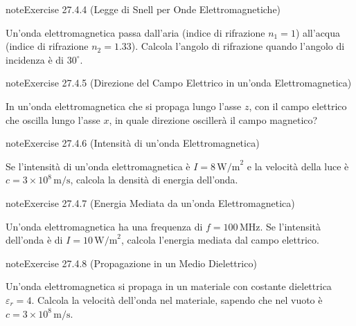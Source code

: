 \documentclass[letterpaper,10pt,italian]{jupyterBook}
\begin{document}
\begin{sphinxadmonition}{note}{Exercise 27.4.4 (Legge di Snell per Onde Elettromagnetiche)}



\sphinxAtStartPar
Un’onda elettromagnetica passa dall’aria (indice di rifrazione \(n_1 = 1\)) all’acqua (indice di rifrazione \(n_2 = 1.33\)). Calcola l’angolo di rifrazione quando l’angolo di incidenza è di \(30^\circ\).
\end{sphinxadmonition}
 \label{exercise:ch/electromagnetism/em-waves-problems-exercise-4}

\begin{sphinxadmonition}{note}{Exercise 27.4.5 (Direzione del Campo Elettrico in un’onda Elettromagnetica)}



\sphinxAtStartPar
In un’onda elettromagnetica che si propaga lungo l’asse \(z\), con il campo elettrico che oscilla lungo l’asse \(x\), in quale direzione oscillerà il campo magnetico?
\end{sphinxadmonition}
 \label{exercise:ch/electromagnetism/em-waves-problems-exercise-5}

\begin{sphinxadmonition}{note}{Exercise 27.4.6 (Intensità di un’onda Elettromagnetica)}



\sphinxAtStartPar
Se l’intensità di un’onda elettromagnetica è \(I = 8 \, \text{W/m}^2\) e la velocità della luce è \(c = 3 \times 10^8 \, \text{m/s}\), calcola la densità di energia dell’onda.
\end{sphinxadmonition}
 \label{exercise:ch/electromagnetism/em-waves-problems-exercise-6}

\begin{sphinxadmonition}{note}{Exercise 27.4.7 (Energia Mediata da un’onda Elettromagnetica)}



\sphinxAtStartPar
Un’onda elettromagnetica ha una frequenza di \(f = 100 \, \text{MHz}\). Se l’intensità dell’onda è di \(I = 10 \, \text{W/m}^2\), calcola l’energia mediata dal campo elettrico.
\end{sphinxadmonition}
 \label{exercise:ch/electromagnetism/em-waves-problems-exercise-7}

\begin{sphinxadmonition}{note}{Exercise 27.4.8 (Propagazione in un Medio Dielettrico)}



\sphinxAtStartPar
Un’onda elettromagnetica si propaga in un materiale con costante dielettrica \(\varepsilon_r = 4\). Calcola la velocità dell’onda nel materiale, sapendo che nel vuoto è \(c = 3 \times 10^8 \, \text{m/s}\).
\end{sphinxadmonition}
 \label{exercise:ch/electromagnetism/em-waves-problems-exercise-8}
\end{document}
